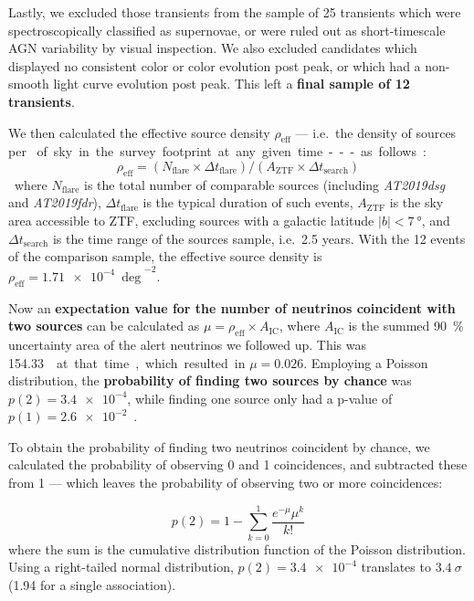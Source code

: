 Lastly, we excluded those transients from the sample of 25 transients which were spectroscopically classified as supernovae, or were ruled out as short-timescale AGN variability by visual inspection. We also excluded candidates which displayed no consistent color or color evolution post peak, or which had a non-smooth light curve evolution post peak. This left a \textbf{final sample of 12 transients}.

We then calculated the effective source density $\rho_\text{eff}$ --- i.e.\ the density of sources per \unit{\square\deg} of sky in the survey footprint at any given time --- as follows:

\begin{equation}
    \rho_\text{eff} = (N_\text{flare} \times \Delta t_\text{flare}) / (A_\text{ZTF}  \times \Delta t_\text{search})
\end{equation}
where $N_\text{flare}$ is the total number of comparable sources (including \emph{AT2019dsg} and \emph{AT2019fdr}), $\Delta t_\text{flare}$ is the typical duration of such events, $A_\text{ZTF}$ is the sky area accessible to ZTF, excluding sources with a galactic latitude $|b|<\SI{7}{\degree}$, and $\Delta t_\text{search}$ is the time range of the sources sample, i.e.\ 2.5 years. With the 12 events of the comparison sample, the effective source density is $\rho_\text{eff} = \SI{1.71e-4}{\deg}^{-2}$.

Now an \textbf{expectation value for the number of neutrinos coincident with two sources} can be calculated as $\mu=\rho_\text{eff}\times A_\text{IC}$, where $A_\text{IC}$ is the summed \SI{90}{\percent} uncertainty area of the alert neutrinos we followed up. This was \SI{154.33}{\square\deg} at that time, which resulted in $\mu=0.026$. Employing a Poisson distribution, the \textbf{probability of finding two sources by chance} was $p(2)=\num{3.4e-4}$, while finding one source only had a p-value of $p(1)=\num{2.6e-2}$~\cite{Reusch2022}.

To obtain the probability of finding two neutrinos coincident by chance, we calculated the probability of observing 0 and 1 coincidences, and subtracted these from 1 --- which leaves the probability of observing two or more coincidences:

\begin{equation}
    p(2) = 1 - \sum_{k=0}^1 \frac{e^{-\mu}\mu^k}{k!}
\end{equation}
where the sum is the cumulative distribution function of the Poisson distribution. Using a right-tailed normal distribution, $p(2)=\num{3.4e-4}$ translates to $\SI{3.4}{\sigma}$ (\SI{1.94}{\sigma} for a single association).

